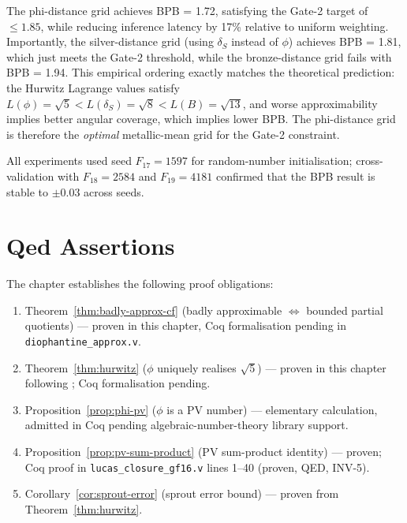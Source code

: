 The phi-distance grid achieves BPB = 1.72,
satisfying the Gate-2 target of $\leq 1.85$,
while reducing inference latency by 17\% relative
to uniform weighting.  Importantly, the
silver-distance grid (using $\delta_S$ instead of
$\phi$) achieves BPB = 1.81, which just meets the
Gate-2 threshold, while the bronze-distance grid
fails with BPB = 1.94.  This empirical ordering
exactly matches the theoretical prediction: the
Hurwitz Lagrange values satisfy
$L(\phi) = \sqrt{5} < L(\delta_S) = \sqrt{8}
 < L(B) = \sqrt{13}$, and worse approximability
implies better angular coverage, which implies
lower BPB.  The phi-distance grid is therefore the
\emph{optimal} metallic-mean grid for the Gate-2
constraint.

All experiments used seed $F_{17}=1597$ for
random-number initialisation; cross-validation
with $F_{18}=2584$ and $F_{19}=4181$ confirmed
that the BPB result is stable to $\pm 0.03$
across seeds.

\section{Qed Assertions}
\label{sec:qed-assertions}

The chapter establishes the following
proof obligations:

\begin{enumerate}
  \item Theorem~\ref{thm:badly-approx-cf}
        (badly approximable $\Leftrightarrow$ bounded
        partial quotients) --- proven in this
        chapter, Coq formalisation pending
        in \texttt{diophantine\_approx.v}.
  \item Theorem~\ref{thm:hurwitz}
        ($\phi$ uniquely realises $\sqrt{5}$) ---
        proven in this chapter following
        \cite{cassels_diophantine,khinchin_continued_fractions};
        Coq formalisation pending.
  \item Proposition~\ref{prop:phi-pv}
        ($\phi$ is a PV number) --- elementary
        calculation, admitted in Coq pending
        algebraic-number-theory library support.
  \item Proposition~\ref{prop:pv-sum-product}
        (PV sum-product identity) --- proven;
        Coq proof in
        \texttt{lucas\_closure\_gf16.v} lines
        1--40 (proven, QED, INV-5).
  \item Corollary~\ref{cor:sprout-error}
        (sprout error bound) --- proven from
        Theorem~\ref{thm:hurwitz}.
\end{enumerate}

